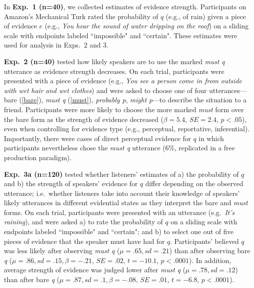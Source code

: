 \documentclass[11pt]{article}
\begin{document}
In \textbf{Exp.~1 (n=40)}, we collected estimates of evidence strength. Participants on Amazon's Mechanical Turk rated the probability of $q$ (e.g., of rain) given a piece of evidence $e$ (e.g., \emph{You hear the sound of water dripping on the roof}) on a sliding scale with endpoints labeled ``impossible" and ``certain". These estimates were used for analysis in Exps.~2 and 3.

\textbf{Exp.~2 (n=40)} tested how likely speakers are to use the marked \emph{must q} utterance as evidence strength decreases. On each trial, participants were presented with a piece of evidence (e.g., \emph{You see a person come in from outside with wet hair and wet clothes}) and were asked to choose one of four utterances---bare (\ref{bare}), \emph{must q} (\ref{must}), \emph{probably p}, \emph{might p}---to describe the situation to a friend. Participants were more likely to choose the more marked \emph{must} form over the bare form as the strength of evidence decreased ($\beta=5.4$, $SE=2.4$, $p<.05$), even when controlling for evidence type (e.g., perceptual, reportative, inferential). Importantly, there were cases of direct perceptual evidence for $q$ in which participants nevertheless chose the \emph{must q} utterance (6\%, replicated in a free production paradigm).

\textbf{Exp.~3a (n=120)} tested whether listeners' estimates of a) the probability of $q$ and b) the strength of speakers' evidence for $q$ differ depending on the observed utterance; i.e.~whether listeners take into account their knowledge of speakers' likely utterances in different evidential states as they interpret the bare and \emph{must} forms. On each trial, participants were presented with an utterance (e.g.~\emph{It's raining}), and were asked a) to rate the probability of $q$ on a sliding scale with endpoints labeled ``impossible" and ``certain"; and b) to select one out of five pieces of evidence that the speaker must have had for $q$. Participants' believed $q$ was less likely after observing  \emph{must q} ($\mu=.65,sd=.21$) than after observing bare \emph{q} ($\mu=.86,sd=.15, \beta=-.21$, $SE=.02$, $t=-10.1$, $p<.0001$). In addition, average strength of evidence was judged lower after \emph{must q} ($\mu=.78,sd=.12$) than after bare \emph{q} ($\mu=.87,sd=.1, \beta=-.08$, $SE=.01$, $t=-6.8$, $p<.0001$).
\end{document}
